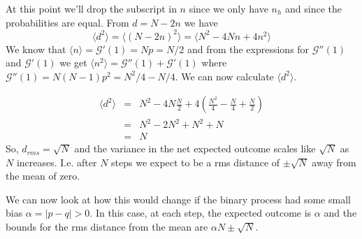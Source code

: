 \documentclass{article}
\newcommand{\calG}{\mathcal{G}}
\begin{document}
At this point we'll drop the subscript in $n$ since we only have $n_h$ and since the probabilities are equal. From $d=N-2n$ we have $$ \langle d^2\rangle = \langle (N-2n)^2\rangle = \langle N^2 -4Nn+4n^2\rangle$$
We know that $\langle n\rangle = \calG'(1)=Np=N/2$ and from the expressions for $\calG''(1)$ and $\calG'(1)$ we get $\langle n^2 \rangle = \calG''(1) + \calG'(1)$ where $\calG''(1) = N(N-1)p^2 = N^2/4-N/4$. We can now calculate $\langle d^2 \rangle$.

\begin{eqnarray*}
	\langle d^2 \rangle &=& N^2 -4N\frac{N}{2}+4\left(\frac{N^2}{4}-\frac{N}{4}+\frac{N}{2}\right)\\
		&=& N^2-2N^2+N^2+N\\
		&=& N
\end{eqnarray*}
So, $d_{rms}=\sqrt{N}$ and the variance in the net expected outcome scales like $\sqrt{N}$ as $N$ increases. I.e. after $N$ steps we expect to be a rms distance of $\pm \sqrt{N}$ away from the mean of zero.

\begin{center}
\end{center}

We can now look at how this would change if the binary process had some small bias $\alpha = |p-q| >0$. In this case, at each step, the expected outcome is $\alpha$ and the bounds for the rms distance from the mean are $\alpha N\pm\sqrt{N}$. 

\begin{center}
\end{center}
\end{document}
